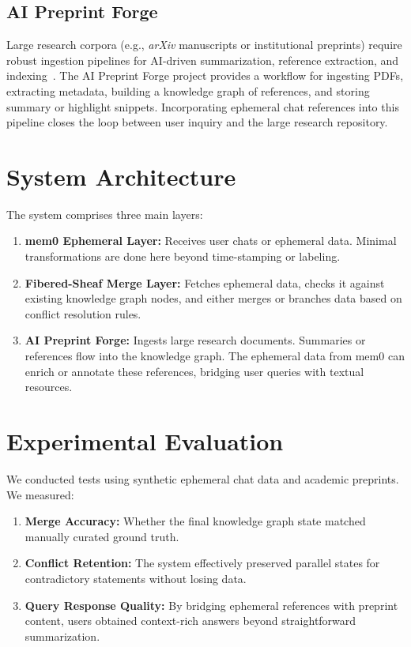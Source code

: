 \documentclass[11pt]{article}
\begin{document}
\subsection{AI Preprint Forge}
Large research corpora (e.g., \textit{arXiv} manuscripts or institutional preprints)
require robust ingestion pipelines for AI-driven summarization, reference extraction,
and indexing~\cite{AIForge2024}. The AI Preprint Forge project provides a workflow for
ingesting PDFs, extracting metadata, building a knowledge graph of references, and
storing summary or highlight snippets. Incorporating ephemeral chat references into
this pipeline closes the loop between user inquiry and the large research repository.

\section{System Architecture}
The system comprises three main layers:

\begin{enumerate}
  \item \textbf{mem0 Ephemeral Layer:} Receives user chats or ephemeral data. 
        Minimal transformations are done here beyond time-stamping or labeling.
  \item \textbf{Fibered-Sheaf Merge Layer:} Fetches ephemeral data, checks it
        against existing knowledge graph nodes, and either merges or branches
        data based on conflict resolution rules.
  \item \textbf{AI Preprint Forge:} Ingests large research documents. Summaries or
        references flow into the knowledge graph. The ephemeral data from mem0 can
        enrich or annotate these references, bridging user queries with textual
        resources.
\end{enumerate}

\section{Experimental Evaluation}
We conducted tests using synthetic ephemeral chat data and academic preprints. We measured:
\begin{enumerate}
  \item \textbf{Merge Accuracy:} Whether the final knowledge graph state matched
        manually curated ground truth.
  \item \textbf{Conflict Retention:} The system effectively preserved parallel states
        for contradictory statements without losing data.
  \item \textbf{Query Response Quality:} By bridging ephemeral references with
        preprint content, users obtained context-rich answers beyond straightforward
        summarization.
\end{enumerate}
\end{document}

